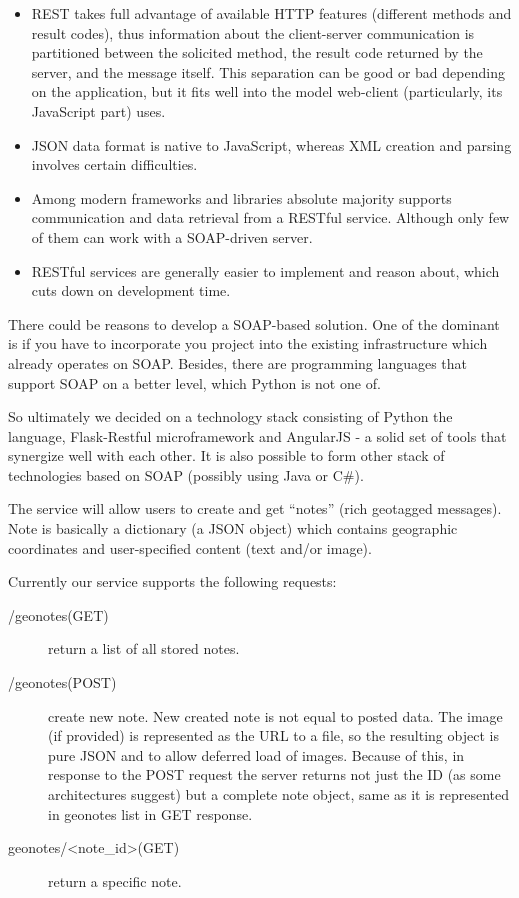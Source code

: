 \documentclass[12pt,a4paper]{article}
\begin{document}
\begin{itemize}
\item REST takes full advantage of available HTTP features (different
  methods and result codes), thus information about the client-server
  communication is partitioned between the solicited method, the
  result code returned by the server, and the message itself. This
  separation can be good or bad depending on the application, but it
  fits well into the model web-client (particularly, its JavaScript
  part) uses.
\item JSON data format is native to JavaScript, whereas XML creation
  and parsing involves certain difficulties.
\item Among modern frameworks and libraries absolute majority supports
  communication and data retrieval from a RESTful service. Although
  only few of them can work with a SOAP-driven server.
\item RESTful services are generally easier to implement and reason
  about, which cuts down on development time.
\end{itemize}

There could be reasons to develop a SOAP-based solution. One of the
dominant is if you have to incorporate you project into the existing
infrastructure which already operates on SOAP\@. Besides, there are
programming languages that support SOAP on a better level, which
Python is not one of.

So ultimately we decided on a technology stack consisting of Python
the language, Flask-Restful microframework and AngularJS - a solid set
of tools that synergize well with each other. It is also possible to
form other stack of technologies based on SOAP (possibly using Java or
C\#).

The service will allow users to create and get ``notes'' (rich geotagged
messages). Note is basically a dictionary (a JSON object) which
contains geographic coordinates and user-specified content (text
and/or image).

Currently our service supports the following requests:

\begin{description}
\item[/geonotes(GET)] return a list of all stored notes.
\item[/geonotes(POST)] create new note. New created note
  is not equal to posted data. The image (if
  provided) is represented as the URL to a file, so the resulting object is
  pure JSON and to allow deferred load of images.
  Because of this, in response to the POST request the server returns
  not just the ID (as some architectures suggest) but a complete note
  object, same as it is represented in geonotes list in GET response.
\item[geonotes/<note\_id>(GET)] return a specific note.
\end{description}
\end{document}
